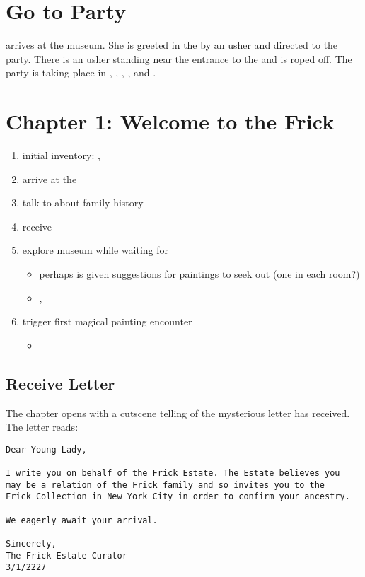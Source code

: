 \documentclass{article}
\begin{document}
\section{Go to Party}
\cyl{} arrives at the museum. She is greeted in the \rentry{} by an usher and directed to the party. There is an usher standing near the entrance to the \rgardencourt{} and \rreception{} is roped off. The party is taking place in \revest{}, \rwvest{}, \rdining{}, \ranter{}, and \rboucher{}.




\newpage
\section{Chapter 1: Welcome to the Frick}
\begin{enumerate}
  \item initial inventory: \ifrickestateletter{}, \iylbag{}
  \item arrive at the \rentrance{}
  \item talk to \ccurator{} about family history 
  \item receive \iaudioguide
  \item explore museum while waiting for \ccurator{}
    \begin{itemize}
      \item perhaps \cyl{} is given suggestions for paintings to seek out (one in each room?)
      \item \pdally{}, \pmemlingman{}
    \end{itemize}
  \item trigger first magical painting encounter
    \begin{itemize}
      \item 
    \end{itemize}
\end{enumerate}
\subsection{Receive Letter}
The chapter opens with a cutscene telling of the mysterious letter \cyl{} has received. The letter reads:
\begin{verbatim}
Dear Young Lady,

I write you on behalf of the Frick Estate. The Estate believes you
may be a relation of the Frick family and so invites you to the
Frick Collection in New York City in order to confirm your ancestry.

We eagerly await your arrival.

Sincerely,
The Frick Estate Curator
3/1/2227
\end{verbatim}
\end{document}
